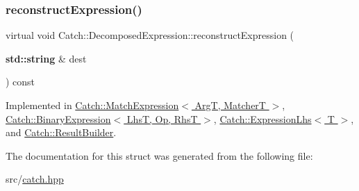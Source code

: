 \mbox{\label{struct_catch_1_1_decomposed_expression_a9ce7f356dc96f11f80e40c82f5aa7e55}} 
\subsubsection{\texorpdfstring{reconstruct\+Expression()}{reconstructExpression()}}
{\footnotesize\ttfamily virtual void Catch\+::\+Decomposed\+Expression\+::reconstruct\+Expression (\begin{DoxyParamCaption}\item[{\textbf{ std\+::string} \&}]{dest }\end{DoxyParamCaption}) const\hspace{0.3cm}{\ttfamily [pure virtual]}}



Implemented in \hyperlink{class_catch_1_1_match_expression_a4410a93bc5b8241eb2502f400fce7ec4}{Catch\+::\+Match\+Expression$<$ Arg\+T, Matcher\+T $>$}, \hyperlink{class_catch_1_1_binary_expression_a6ed73ff9af9c229f9fa3d35d019f9e37}{Catch\+::\+Binary\+Expression$<$ Lhs\+T, Op, Rhs\+T $>$}, \hyperlink{class_catch_1_1_expression_lhs_a7684a053e8e88a4be475a536252630da}{Catch\+::\+Expression\+Lhs$<$ T $>$}, and \hyperlink{class_catch_1_1_result_builder_a7d94b15cf04301a8617e7b16158b5d82}{Catch\+::\+Result\+Builder}.



The documentation for this struct was generated from the following file\+:\begin{DoxyCompactItemize}
\item 
src/\hyperlink{catch_8hpp}{catch.\+hpp}\end{DoxyCompactItemize}
